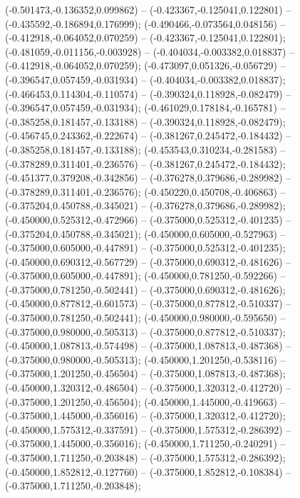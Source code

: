  (-0.501473,-0.136352,0.099862) -- (-0.423367,-0.125041,0.122801) -- (-0.435592,-0.186894,0.176999);
 (-0.490466,-0.073564,0.048156) -- (-0.412918,-0.064052,0.070259) -- (-0.423367,-0.125041,0.122801);
 (-0.481059,-0.011156,-0.003928) -- (-0.404034,-0.003382,0.018837) -- (-0.412918,-0.064052,0.070259);
 (-0.473097,0.051326,-0.056729) -- (-0.396547,0.057459,-0.031934) -- (-0.404034,-0.003382,0.018837);
 (-0.466453,0.114304,-0.110574) -- (-0.390324,0.118928,-0.082479) -- (-0.396547,0.057459,-0.031934);
 (-0.461029,0.178184,-0.165781) -- (-0.385258,0.181457,-0.133188) -- (-0.390324,0.118928,-0.082479);
 (-0.456745,0.243362,-0.222674) -- (-0.381267,0.245472,-0.184432) -- (-0.385258,0.181457,-0.133188);
 (-0.453543,0.310234,-0.281583) -- (-0.378289,0.311401,-0.236576) -- (-0.381267,0.245472,-0.184432);
 (-0.451377,0.379208,-0.342856) -- (-0.376278,0.379686,-0.289982) -- (-0.378289,0.311401,-0.236576);
 (-0.450220,0.450708,-0.406863) -- (-0.375204,0.450788,-0.345021) -- (-0.376278,0.379686,-0.289982);
 (-0.450000,0.525312,-0.472966) -- (-0.375000,0.525312,-0.401235) -- (-0.375204,0.450788,-0.345021);
 (-0.450000,0.605000,-0.527963) -- (-0.375000,0.605000,-0.447891) -- (-0.375000,0.525312,-0.401235);
 (-0.450000,0.690312,-0.567729) -- (-0.375000,0.690312,-0.481626) -- (-0.375000,0.605000,-0.447891);
 (-0.450000,0.781250,-0.592266) -- (-0.375000,0.781250,-0.502441) -- (-0.375000,0.690312,-0.481626);
 (-0.450000,0.877812,-0.601573) -- (-0.375000,0.877812,-0.510337) -- (-0.375000,0.781250,-0.502441);
 (-0.450000,0.980000,-0.595650) -- (-0.375000,0.980000,-0.505313) -- (-0.375000,0.877812,-0.510337);
 (-0.450000,1.087813,-0.574498) -- (-0.375000,1.087813,-0.487368) -- (-0.375000,0.980000,-0.505313);
 (-0.450000,1.201250,-0.538116) -- (-0.375000,1.201250,-0.456504) -- (-0.375000,1.087813,-0.487368);
 (-0.450000,1.320312,-0.486504) -- (-0.375000,1.320312,-0.412720) -- (-0.375000,1.201250,-0.456504);
 (-0.450000,1.445000,-0.419663) -- (-0.375000,1.445000,-0.356016) -- (-0.375000,1.320312,-0.412720);
 (-0.450000,1.575312,-0.337591) -- (-0.375000,1.575312,-0.286392) -- (-0.375000,1.445000,-0.356016);
 (-0.450000,1.711250,-0.240291) -- (-0.375000,1.711250,-0.203848) -- (-0.375000,1.575312,-0.286392);
 (-0.450000,1.852812,-0.127760) -- (-0.375000,1.852812,-0.108384) -- (-0.375000,1.711250,-0.203848);
